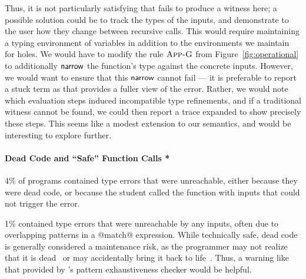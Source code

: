 Thus, it is not particularly satisfying that \toolname fails to produce
a witness here; a possible solution could be to track the types of the
inputs, and demonstrate to the user how they change between recursive
calls.
%
This would require maintaining a typing environment of variables in
addition to the environments we maintain for holes.
%
We would have to modify the rule $\textsc{App-G}$ from
Figure~\ref{fig:operational} to additionally $\mathsf{narrow}$ the function's
type against the concrete inputs.
%
However, we would want to ensure that this $\mathsf{narrow}$ cannot fail ---
it is preferable to report a stuck term as that provides a fuller view
of the error.
%
Rather, we would note which evaluation steps induced incompatible
type refinements, and if a traditional witness cannot be found, we could
then report a trace expanded to show precisely these steps.
%
This seems like a modest extension to our semantics, and would be
interesting to explore further.

\paragraph{Dead Code and ``Safe'' Function Calls *}
%
4\% of programs contained type errors that were unreachable, either
because they were dead code, or because the student called the function
with inputs that could not trigger the error.


1\% contained type errors that were unreachable by any inputs, often due
to overlapping patterns in a @match@ expression.
%
%
While technically safe, dead code is generally considered a maintenance
risk, as the programmer may not realize that it is dead~\cite{Wheeler2014-fg}
or may accidentally bring it back to life~\cite{Seven2014-gf}.
%
Thus, a warning like that provided by \ocaml's pattern exhaustiveness
checker would be helpful.


